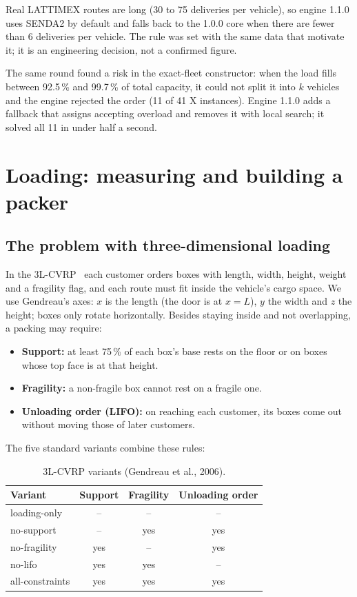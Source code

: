 \documentclass[11pt,a4paper]{article}
\newcommand{\sendados}{SENDA2}
\begin{document}
Real LATTIMEX routes are long (30 to 75 deliveries per vehicle), so engine 1.1.0 uses \sendados{} by
default and falls back to the 1.0.0 core when there are fewer than 6 deliveries per vehicle. The rule
was set with the same data that motivate it; it is an engineering decision, not a confirmed figure.

The same round found a risk in the exact-fleet constructor: when the load fills between 92.5\,\% and
99.7\,\% of total capacity, it could not split it into $k$ vehicles and the engine rejected the order (11
of 41 X instances). Engine 1.1.0 adds a fallback that assigns accepting overload and removes it with
local search; it solved all 11 in under half a second.

\section{Loading: measuring and building a packer}
\label{sec:carga}

\subsection{The problem with three-dimensional loading}

In the 3L-CVRP~\cite{gendreau2006} each customer orders boxes with length, width, height, weight and a
fragility flag, and each route must fit inside the vehicle's cargo space. We use Gendreau's axes: $x$
is the length (the door is at $x=L$), $y$ the width and $z$ the height; boxes only rotate horizontally.
Besides staying inside and not overlapping, a packing may require:

\begin{itemize}[leftmargin=1.5em]
\item \textbf{Support:} at least 75\,\% of each box's base rests on the floor or on boxes whose top face
is at that height.
\item \textbf{Fragility:} a non-fragile box cannot rest on a fragile one.
\item \textbf{Unloading order (LIFO):} on reaching each customer, its boxes come out without moving
those of later customers.
\end{itemize}

The five standard variants combine these rules:

\begin{table}[H]
\centering
\caption{3L-CVRP variants (Gendreau et al., 2006).}
\label{tab:variantes}
\begin{tabular}{lccc}
\toprule
Variant & Support & Fragility & Unloading order \\
\midrule
loading-only & -- & -- & -- \\
no-support & -- & yes & yes \\
no-fragility & yes & -- & yes \\
no-lifo & yes & yes & -- \\
all-constraints & yes & yes & yes \\
\bottomrule
\end{tabular}
\end{table}
\end{document}
